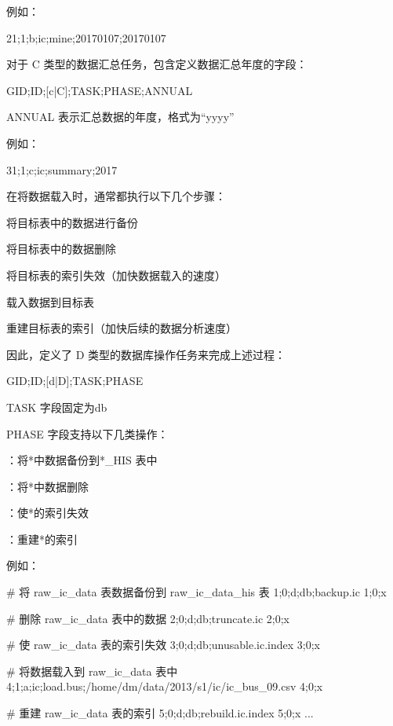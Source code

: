 例如：
\begin{examplecode}
21;1;b;ic;mine;20170107;20170107
\end{examplecode}

对于 C 类型的数据汇总任务，包含定义数据汇总年度的字段：
\begin{scriptcode}
GID;ID;[c|C];TASK;PHASE;ANNUAL
\end{scriptcode}
\begin{para}
\item[ANNUAL] 表示汇总数据的年度，格式为“yyyy”
\end{para}

例如：
\begin{examplecode}
31;1;c;ic;summary;2017
\end{examplecode}

在将数据载入时，通常都执行以下几个步骤：
\begin{nbeae}
\item 将目标表中的数据进行备份
\item 将目标表中的数据删除
\item 将目标表的索引失效（加快数据载入的速度）
\item 载入数据到目标表
\item 重建目标表的索引（加快后续的数据分析速度）
\end{nbeae}

因此，定义了 D 类型的数据库操作任务来完成上述过程：
\begin{scriptcode}
GID;ID;[d|D];TASK;PHASE
\end{scriptcode}
\begin{para}
\item[TASK] 字段固定为db
\item[PHASE] 字段支持以下几类操作：
\begin{cit}
\item {}：将*中数据备份到*\_HIS 表中
\item {}：将*中数据删除
\item {}：使*的索引失效
\item {}：重建*的索引
\end{cit}
\end{para}

例如：
\begin{examplecode}
# 将 raw_ic_data 表数据备份到 raw_ic_data_his 表
1;0;d;db;backup.ic
1;0;x

# 删除 raw_ic_data 表中的数据
2;0;d;db;truncate.ic
2;0;x

# 使 raw_ic_data 表的索引失效
3;0;d;db;unusable.ic.index
3;0;x

# 将数据载入到 raw_ic_data 表中
4;1;a;ic;load.bus;/home/dm/data/2013/s1/ic/ic_bus_09.csv
4;0;x

# 重建 raw_ic_data 表的索引
5;0;d;db;rebuild.ic.index
5;0;x
...
\end{examplecode}

